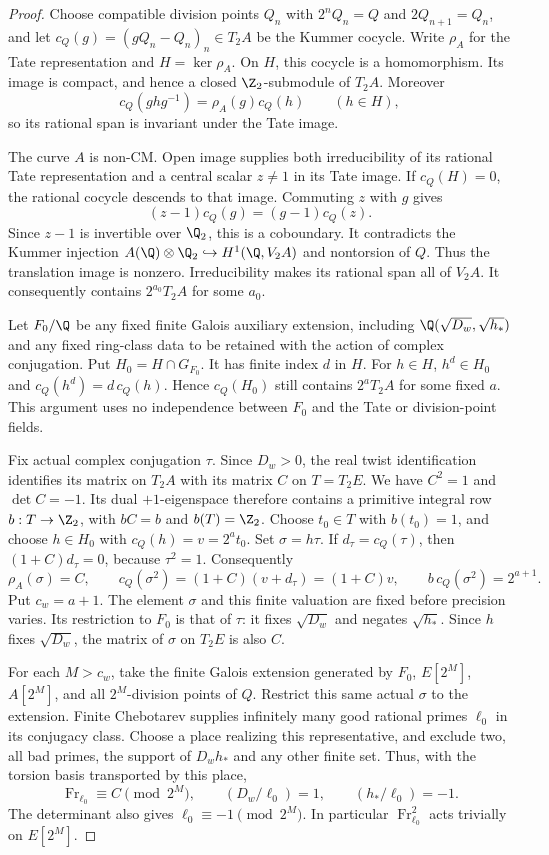 \begin{proof}
Choose compatible division points $Q_n$ with
$2^nQ_n=Q$ and $2Q_{n+1}=Q_n$, and let
$c_Q(g)=(gQ_n-Q_n)_n\in T_2A$ be the Kummer cocycle.
Write $\rho_A$ for the Tate representation and $H=\ker\rho_A$.
On $H$, this cocycle is a homomorphism. Its image is compact,
and hence a closed $\Z_2$-submodule of $T_2A$. Moreover
\[
 c_Q(ghg^{-1})=\rho_A(g)c_Q(h)\qquad(h\in H),
\]
so its rational span is invariant under the Tate image.

The curve $A$ is non-CM. Open image \cite{serre} supplies both
irreducibility of its rational Tate representation and a central
scalar $z\ne1$ in its Tate image. If $c_Q(H)=0$, the rational
cocycle descends to that image. Commuting $z$ with $g$ gives
\[
 (z-1)c_Q(g)=(g-1)c_Q(z).
\]
Since $z-1$ is invertible over $\Q_2$, this is a coboundary.
It contradicts the Kummer injection
$A(\Q)\otimes\Q_2\hookrightarrow H^1(\Q,V_2A)$ and
nontorsion of $Q$. Thus the translation image is nonzero.
Irreducibility makes its rational span all of $V_2A$.
It consequently contains $2^{a_0}T_2A$ for some $a_0$.

Let $F_0/\Q$ be any fixed finite Galois auxiliary extension,
including $\Q(\sqrt{D_w},\sqrt{h_*})$ and any fixed ring-class
data to be retained with the action of complex conjugation.
Put $H_0=H\cap G_{F_0}$. It has finite index $d$ in $H$.
For $h\in H$, $h^d\in H_0$ and
$c_Q(h^d)=d\,c_Q(h)$. Hence $c_Q(H_0)$ still contains
$2^aT_2A$ for some fixed $a$.
This argument uses no independence between $F_0$ and the Tate
or division-point fields.

Fix actual complex conjugation $\tau$. Since $D_w>0$, the real
twist identification identifies its matrix on $T_2A$ with its
matrix $C$ on $T=T_2E$. We have $C^2=1$ and $\det C=-1$.
Its dual $+1$-eigenspace therefore contains a primitive integral
row $b:T\to\Z_2$, with $bC=b$ and $b(T)=\Z_2$.
Choose $t_0\in T$ with $b(t_0)=1$, and choose $h\in H_0$ with
$c_Q(h)=v=2^at_0$. Set $\sigma=h\tau$. If $d_\tau=c_Q(\tau)$,
then $(1+C)d_\tau=0$, because $\tau^2=1$. Consequently
\[
 \rho_A(\sigma)=C,\qquad
 c_Q(\sigma^2)=(1+C)(v+d_\tau)=(1+C)v,\qquad
 b\,c_Q(\sigma^2)=2^{a+1}.
\]
Put $c_w=a+1$. The element $\sigma$ and this finite valuation
are fixed before precision varies. Its restriction to $F_0$
is that of $\tau$: it fixes $\sqrt{D_w}$ and negates
$\sqrt{h_*}$. Since $h$ fixes $\sqrt{D_w}$, the matrix of
$\sigma$ on $T_2E$ is also $C$.

For each $M>c_w$, take the finite Galois extension generated by
$F_0$, $E[2^M]$, $A[2^M]$, and all $2^M$-division points of $Q$.
Restrict this same actual $\sigma$ to the extension. Finite
Chebotarev supplies infinitely many good rational primes $\ell_0$
in its conjugacy class. Choose a place realizing this representative,
and exclude two, all bad primes, the support of $D_wh_*$ and any
other finite set. Thus, with the torsion basis transported by this
place,
\[
 \operatorname{Fr}_{\ell_0}\equiv C\pmod{2^M},\qquad
 (D_w/\ell_0)=1,\qquad(h_*/\ell_0)=-1.
\]
The determinant also gives $\ell_0\equiv-1\pmod{2^M}$.
In particular $\operatorname{Fr}_{\ell_0}^2$ acts trivially on
$E[2^M]$.


\end{proof}
